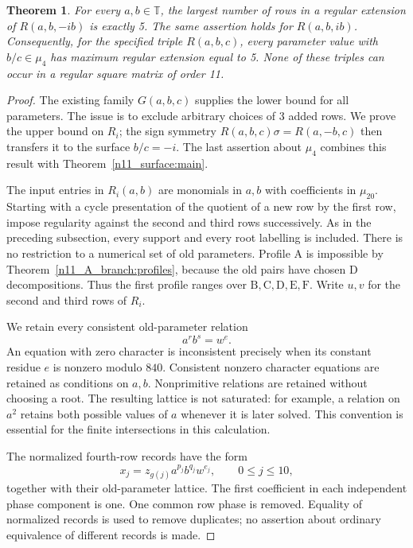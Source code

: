 \documentclass[11pt,a4paper]{article}
\newtheorem{theorem}{Theorem}[section]
\theoremstyle{plain}
\theoremstyle{definition}
\theoremstyle{plain}
\begin{document}
\par\addvspace{\medskipamount}\noindent
\begin{minipage}{\linewidth}
\begin{theorem}\label{n11_imaginary:main}
For every $a,b\in\mathbb T$, the largest number of rows in a regular extension of $R(a,b,-ib)$ is exactly 5. The same assertion holds for $R(a,b,ib)$. Consequently, for the specified triple $R(a,b,c)$, every parameter value with $b/c\in\mu_4$ has maximum regular extension equal to 5. None of these triples can occur in a regular square matrix of order 11.
\end{theorem}
\end{minipage}
\par\addvspace{\medskipamount}

\begin{proof}
The existing family $G(a,b,c)$ supplies the lower bound for all parameters. The issue is to exclude arbitrary choices of 3 added rows. We prove the upper bound on $R_i$; the sign symmetry $R(a,b,c)\sigma=R(a,-b,c)$ then transfers it to the surface $b/c=-i$. The last assertion about $\mu_4$ combines this result with Theorem~\ref{n11_surface:main}.

\medskip
The input entries in $R_i(a,b)$ are monomials in $a,b$ with coefficients in $\mu_{20}$. Starting with a cycle presentation of the quotient of a new row by the first row, impose regularity against the second and third rows successively. As in the preceding subsection, every support and every root labelling is included. There is no restriction to a numerical set of old parameters. Profile $\mathrm{A}$ is impossible by Theorem~\ref{n11_A_branch:profiles}, because the old pairs have chosen $\mathrm{D}$ decompositions. Thus the first profile ranges over $\mathrm{B},\mathrm{C},\mathrm{D},\mathrm{E},\mathrm{F}$. Write $u,v$ for the second and third rows of $R_i$.

We retain every consistent old-parameter relation
\[
a^r b^s=w^{e}.
\]
An equation with zero character is inconsistent precisely when its constant residue $e$ is nonzero modulo $840$. Consistent nonzero character equations are retained as conditions on $a,b$. Nonprimitive relations are retained without choosing a root. The resulting lattice is not saturated: for example, a relation on $a^2$ retains both possible values of $a$ whenever it is later solved. This convention is essential for the finite intersections in this calculation.

The normalized fourth-row records have the form
\[
x_j=z_{g(j)}a^{p_j}b^{q_j}w^{e_j},
\qquad 0\leq j\leq10,
\]
together with their old-parameter lattice. The first coefficient in each independent phase component is one. One common row phase is removed. Equality of normalized records is used to remove duplicates; no assertion about ordinary equivalence of different records is made.


\end{proof}
\end{document}
